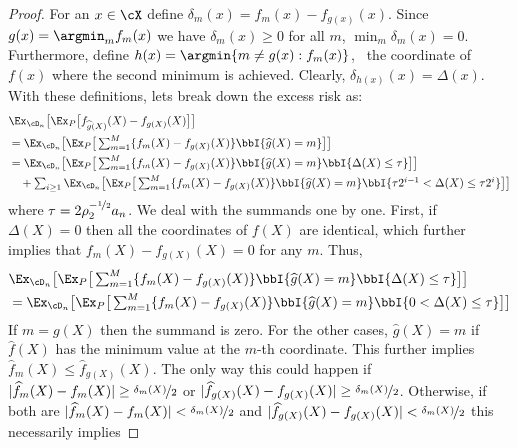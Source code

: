 \begin{proof}
    For an $x \in \cX$ define $\delta_m(x) = f_m(x) -  f_{g(x)}(x)$. Since $g(x) = \argmin_m f_m(x)$ we have $\delta_m(x) \ge 0$ for all $m$,  $\min_{m}\delta_m(x) = 0$. Furthermore, define $h(x) = \argmin\{m \neq g(x): f_m(x)  \}$, \ie\ the coordinate of $f(x)$ where the second minimum is achieved. Clearly, $\delta_{h(x)}(x) = \Delta(x)$. With these definitions, lets break down the excess risk as: 
    \begin{equation}\label{eq:tech-1}
    \begin{aligned}
         & \Ex_{\cD_n}\big [ \Ex_P\big [ f_{\widehat g(X)}(X) - f_{g(X)}(X)  \big]\big ]\\
         & = \textstyle  \Ex_{\cD_n}\big [ \Ex_P\big [ \sum _{m = 1}^M\{f_{m}(X) - f_{g(X)}(X)\} \bbI \{ \widehat g(X) = m\}  \big]\big ] \\
         & = \textstyle  \Ex_{\cD_n}\big [ \Ex_P\big [ \sum _{m = 1}^M\{f_{m}(X) - f_{g(X)}(X)\} \bbI \{ \widehat g(X) = m\} \bbI \{ \Delta(X) \le \tau\}   \big]\big ] \\
         & \quad \textstyle + \sum_{i \ge 1} \Ex_{\cD_n}\big [ \Ex_P\big [ \sum _{m = 1}^M\{f_{m}(X) - f_{g(X)}(X)\} \bbI \{ \widehat g(X) = m\} \bbI \{ \tau 2^{i -1} < \Delta(X) \le \tau 2^i \}   \big]\big ]
    \end{aligned}
    \end{equation} where $\tau = 2\rho_2^{-\nicefrac{1}{2}}a_n$. 
    We deal with the summands one by one. First, if $\Delta(X) = 0$ then all the coordinates of $f(X)$ are identical, which further implies that $f_m(X) - f_{g(X)}(X) = 0$ for any $m$. Thus, 
    \[
    \begin{aligned}
        & \textstyle \Ex_{\cD_n}\big [ \Ex_P\big [ \sum _{m = 1}^M\{f_{m}(X) - f_{g(X)}(X)\} \bbI \{ \widehat g(X) = m\} \bbI \{ \Delta(X) \le \tau\}   \big]\big ]\\
        & \textstyle = \Ex_{\cD_n}\big [ \Ex_P\big [ \sum _{m = 1}^M\{f_{m}(X) - f_{g(X)}(X)\} \bbI \{ \widehat g(X) = m\} \bbI \{ 0 < \Delta(X) \le \tau\}   \big]\big ]
    \end{aligned}
    \] If $m = g(X)$ then the summand is zero. For the other cases, $\widehat g(X) = m $ if $\widehat f(X)$ has the minimum value at the $m$-th coordinate. This further implies $\widehat f_m (X) \le \widehat f_{ g(X)}(X)$. The only way this could happen if $|\widehat f_m(X) - f_m(X)| \ge \nicefrac{\delta_m(X)}{2}$ or $|\widehat f_{g(X)}(X) - f_{g(X)}(X)| \ge \nicefrac{\delta_m(X)}{2}$. Otherwise, if both are $|\widehat f_m(X) - f_m(X)| < \nicefrac{\delta_m(X)}{2}$ and $|\widehat f_{g(X)}(X) - f_{g(X)}(X)| < \nicefrac{\delta_m(X)}{2}$ this necessarily implies 

\end{proof}
